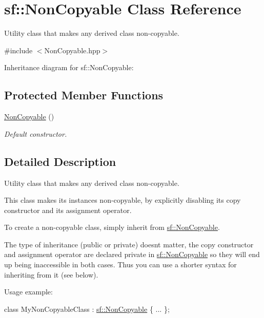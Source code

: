 \hypertarget{classsf_1_1_non_copyable}{}\section{sf\+:\+:Non\+Copyable Class Reference}
\label{classsf_1_1_non_copyable}


Utility class that makes any derived class non-\/copyable.  




{\ttfamily \#include $<$Non\+Copyable.\+hpp$>$}



Inheritance diagram for sf\+:\+:Non\+Copyable\+:
\subsection*{Protected Member Functions}
\begin{DoxyCompactItemize}
\item 
\hyperlink{classsf_1_1_non_copyable_a2110add170580fdb946f887719da6860}{Non\+Copyable} ()
\begin{DoxyCompactList}\small\item\em Default constructor. \end{DoxyCompactList}\end{DoxyCompactItemize}


\subsection{Detailed Description}
Utility class that makes any derived class non-\/copyable. 

This class makes its instances non-\/copyable, by explicitly disabling its copy constructor and its assignment operator.

To create a non-\/copyable class, simply inherit from \hyperlink{classsf_1_1_non_copyable}{sf\+::\+Non\+Copyable}.

The type of inheritance (public or private) doesn\textquotesingle{}t matter, the copy constructor and assignment operator are declared private in \hyperlink{classsf_1_1_non_copyable}{sf\+::\+Non\+Copyable} so they will end up being inaccessible in both cases. Thus you can use a shorter syntax for inheriting from it (see below).

Usage example\+: 
\begin{DoxyCode}
\textcolor{keyword}{class }MyNonCopyableClass : \hyperlink{classsf_1_1_non_copyable}{sf::NonCopyable}
\{
    ...
\};
\end{DoxyCode}


